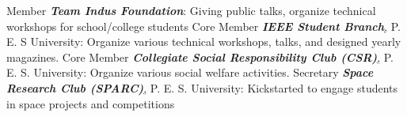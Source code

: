 	\begin{cvskills}
	\cvskill
		{Member}
		{\textit{\textbf{Team Indus Foundation}}: Giving public talks, organize technical workshops for school/college students}
	\cvskill
		{Core Member}
		{\textit{\textbf{IEEE Student Branch}}\href{http://ieee.pes.edu/}, P. E. S University: Organize various technical workshops, talks, and designed yearly magazines.}
	\cvskill
		{Core Member}
		{\textit{\textbf{Collegiate Social Responsibility Club (CSR)}}\href{http://pes.edu/clubs/pes-csr-club/}, P. E. S. University: Organize various social welfare activities.}
	\cvskill
		{Secretary}
		{\textit{\textbf{Space Research Club (SPARC)}}\href{https://www.facebook.com/Space-Research-Club-Of-PES-University-487153011445398/?tn-str=k*F}, P. E. S. University: Kickstarted to engage students in space projects and competitions}
\end{cvskills}
